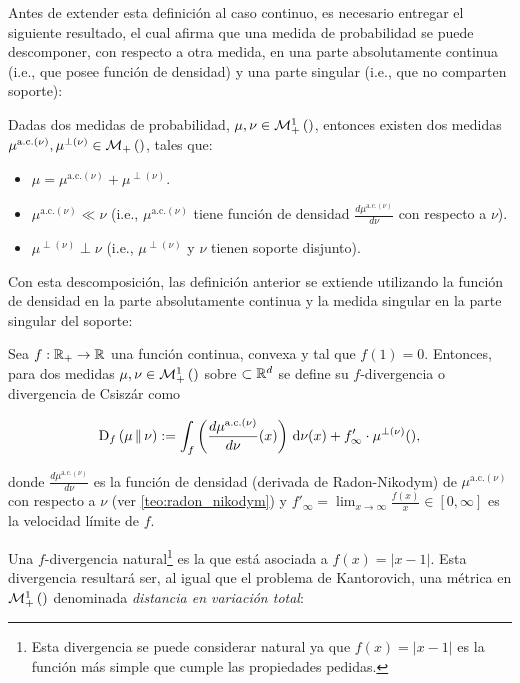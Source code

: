 Antes de extender esta definición al caso continuo, es necesario entregar el siguiente resultado, el cual afirma que una medida de probabilidad se puede descomponer, con respecto a otra medida, en una parte absolutamente continua (i.e., que posee función de densidad) y una parte singular (i.e., que no comparten soporte):

\begin{teo}
	Dadas dos medidas de probabilidad, $\mu,\nu\in\mathcal{M}_+^1\left(\right)$, entonces existen dos medidas $\mu^{\text{a.c.}(\nu)},\mu^{\perp(\nu)}\in\mathcal{M}_+\left(\right)$, tales que:

	\begin{itemize}
		\item $\mu = \mu^{\text{a.c.}(\nu)} + \mu^{\perp(\nu)}$.
		\item $\mu^{\text{a.c.}(\nu)} \ll \nu$ (i.e., $\mu^{\text{a.c.}(\nu)}$ tiene función de densidad $\frac{d\mu^{\text{a.c.}(\nu)}}{d\nu}$ con respecto a $\nu$).
		\item $\mu^{\perp(\nu)} \perp \nu$ (i.e., $\mu^{\perp(\nu)}$ y $\nu$ tienen soporte disjunto).
	\end{itemize}
\end{teo}

Con esta descomposición, las definición anterior se extiende utilizando la función de densidad en la parte absolutamente continua y la medida singular en la parte singular del soporte:

\begin{defn}
	\label{defn:f_div}
	Sea $f:\mathbb{R}_+\to\mathbb{R}$ una función continua, convexa y tal que $f(1)=0$. Entonces, para dos medidas $\mu,\nu\in\mathcal{M}_+^1\left(\right)$ sobre $\subset\mathbb{R}^d$ se define su $f$-divergencia o divergencia de Csiszár como

	\begin{equation}
		\label{eq:f_div}
		\operatorname{D}_f\left(\mu\,\|\,\nu\right)
		:= \int_ f\left(\frac{d\mu^{\text{a.c.}(\nu)}}{d\nu}(x)\right) \,\operatorname{d}\!\nu(x) + f'_\infty\cdot \mu^{\perp(\nu)}() ,
	\end{equation}

	donde $\frac{d\mu^{\text{a.c.}(\nu)}}{d\nu}$ es la función de densidad (derivada de Radon-Nikodym) de $\mu^{\text{a.c.}(\nu)}$ con respecto a $\nu$ (ver \autoref{teo:radon_nikodym}) y	$f'_\infty = \lim_{x\to\infty} \frac{f(x)}{x}\in[0,\infty]$ es la velocidad límite de $f$.
\end{defn}


Una $f$-divergencia natural\footnote{Esta divergencia se puede considerar natural ya que $f(x) = |x-1|$ es la función más simple que cumple las propiedades pedidas.} es la que está asociada a $f(x) = |x-1|$. Esta divergencia resultará ser, al igual que el problema de Kantorovich, una métrica en $\mathcal{M}_+^1\left(\right)$ denominada \textit{distancia en variación total}:

